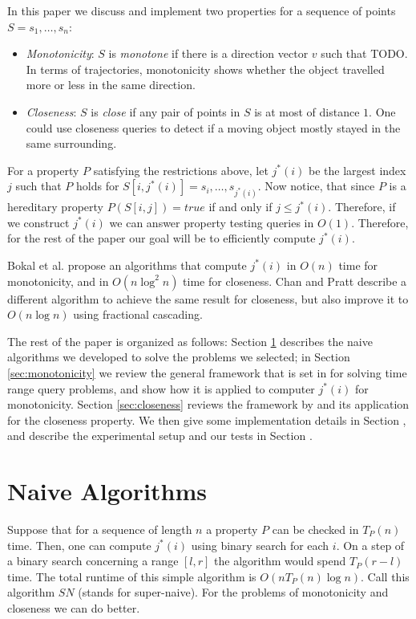 \documentclass{article}
\begin{document}
In this paper we discuss and implement two properties for a sequence of points $S = s_1, \dots, s_n$:
\begin{itemize}
    \item \textit{Monotonicity}:  $S$ is \textit{monotone} if there is a direction vector $v$ such that TODO. In terms of trajectories, monotonicity shows whether the object travelled more or less in the same direction.
    
    \item \textit{Closeness}: $S$ is \textit{close} if any pair of points in $S$ is at most of distance $1$. One could use closeness queries to detect if a moving object mostly stayed in the same surrounding.
\end{itemize}

For a property $P$ satisfying the restrictions above, let $j^*(i)$ be the largest index $j$ such that $P$ holds for $S[i, j^*(i)] = s_i, \dots, s_{j^*(i)}$. Now notice, that since $P$ is a hereditary property $P(S[i, j]) = true$ if and only if $j \leq j^*(i)$. Therefore, if we construct $j^*(i)$ we can answer property testing queries in $O(1)$. Therefore, for the rest of the paper our goal will be to efficiently compute $j^*(i)$.

Bokal et al. \cite{bokal2015} propose an algorithms that compute $j^*(i)$ in $O(n)$ time for monotonicity, and in $O(n\log^2 n)$ time for closeness. Chan and Pratt \cite{chan2016} describe a different algorithm to achieve the same result for closeness, but also improve it to $O(n\log n)$ using fractional cascading.

The rest of the paper is organized as follows: Section \ref{sec:naive} describes the naive algorithms we developed to solve the problems we selected; in Section \ref{sec:monotonicity} we review the general framework that is set in \cite{bokal2015} for solving time range query problems, and show how it is applied to computer $j^*(i)$ for monotonicity. Section \ref{sec:closeness} reviews the framework by \cite{chan2016} and its application for the closeness property. We then give some implementation details in Section \cite{sec:implementation}, and describe the experimental setup and our tests in Section \cite{sec:experiments}.

\section{Naive Algorithms}
\label{sec:naive}
Suppose that for a sequence of length $n$ a property $P$ can be checked in $T_P(n)$ time. Then, one can compute $j^*(i)$ using binary search for each $i$. On a step of a binary search concerning a range $[l, r]$ the algorithm would spend $T_P(r - l)$ time. The total runtime of this simple algorithm is $O(nT_P(n)\log n)$. Call this algorithm $SN$ (stands for super-naive). For the problems of monotonicity and closeness we can do better.
\end{document}
